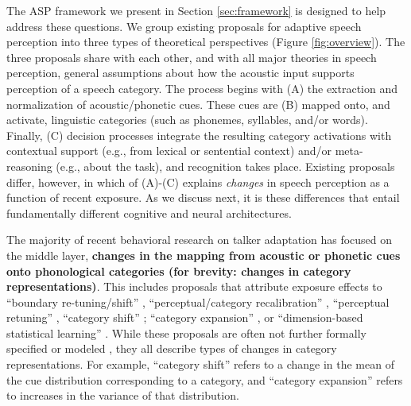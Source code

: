 \documentclass[
  11pt,
  man,floatsintext]{apa6}
\begin{document}
The ASP framework we present in Section \ref{sec:framework} is designed to help address these questions. We group existing proposals for adaptive speech perception into three types of theoretical perspectives (Figure \ref{fig:overview}). The three proposals share with each other, and with all major theories in speech perception, general assumptions about how the acoustic input supports perception of a speech category. The process begins with (A) the extraction and normalization of acoustic/phonetic cues. These cues are (B) mapped onto, and activate, linguistic categories (such as phonemes, syllables, and/or words). Finally, (C) decision processes integrate the resulting category activations with contextual support (e.g., from lexical or sentential context) and/or meta-reasoning (e.g., about the task), and recognition takes place. Existing proposals differ, however, in which of (A)-(C) explains \emph{changes} in speech perception as a function of recent exposure. As we discuss next, it is these differences that entail fundamentally different cognitive and neural architectures.

The majority of recent behavioral research on talker adaptation has focused on the middle layer, \textbf{changes in the mapping from acoustic or phonetic cues onto phonological categories (for brevity: changes in category representations)}. This includes proposals that attribute exposure effects to ``boundary re-tuning/shift'' \autocites[e.g.,][]{norris2003,reinisch2013}, ``perceptual/category recalibration'' \autocites[e.g.,][]{kraljic-samuel2006,reinisch-holt2013,samuel2016,vroomen-baart2009}, ``perceptual retuning'' \autocite{jesse-mcqueen2011,mcqueen2006,mitterer2013}, ``category shift'' \autocite{lindsay2022,sawusch-pisoni1976}; ``category expansion'' \autocite{schmale2012}, or ``dimension-based statistical learning'' \autocite{idemaru-holt2011,lehet-holt2020,liu-holt2015}. While these proposals are often not further formally specified or modeled \autocites[for notable exceptions, see][]{apfelbaum-mcmurray2015,clayards2008,harmon2019,hitczenko-feldman2016,kleinschmidt-jaeger2015,lancia-winter2013,xie2021cognition}, they all describe types of changes in category representations. For example, ``category shift'' refers to a change in the mean of the cue distribution corresponding to a category, and ``category expansion'' refers to increases in the variance of that distribution.
\end{document}
